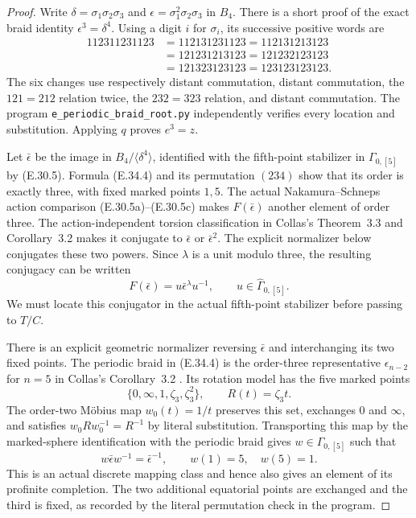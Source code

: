 \begin{proof}
Write
$\delta=\sigma_1\sigma_2\sigma_3$ and
$\epsilon=\sigma_1^2\sigma_2\sigma_3$ in $B_4$.
There is a short proof of the exact braid identity
$\epsilon^3=\delta^4$.  Using a digit $i$ for
$\sigma_i$, its successive positive words are
\[
\begin{aligned}
 112311231123&=112131231123=112131213123\\
             &=121231213123=121232123123\\
             &=121323123123=123123123123.
\end{aligned}
 \tag{E.34.4}
\]
The six changes use respectively distant commutation,
distant commutation, the $121=212$ relation twice,
the $232=323$ relation, and distant commutation.
The program \texttt{e\_periodic\_braid\_root.py}
independently verifies every location and substitution.
Applying $q$ proves $e^3=z$.

Let $\bar\epsilon$ be the image in
$B_4/\langle\delta^4\rangle$, identified with the
fifth-point stabilizer in $\Gamma_{0,[5]}$ by
\textup{(E.30.5)}.  Formula \textup{(E.34.4)} and
its permutation $(234)$ show that its order is
exactly three, with fixed marked points $1,5$.
The actual Nakamura--Schneps action comparison
\textup{(E.30.5a)--(E.30.5c)} makes
$F(\bar\epsilon)$ another element of order three.
The action-independent torsion classification in
Collas's Theorem~3.3 and Corollary~3.2 makes it
conjugate to $\bar\epsilon$ or $\bar\epsilon^2$.
The explicit normalizer below conjugates these
two powers.  Since $\lambda$ is a unit modulo
three, the resulting conjugacy can be written
\[
 F(\bar\epsilon)=u\bar\epsilon^\lambda u^{-1},
                   \qquad u\in\widehat\Gamma_{0,[5]}.
 \tag{E.34.5}
\]
We must locate this conjugator in the actual
fifth-point stabilizer before passing to $T/C$.

There is an explicit geometric normalizer reversing
$\bar\epsilon$ and interchanging its two fixed
points.  The periodic braid in
\textup{(E.34.4)} is the order-three representative
$\epsilon_{n-2}$ for $n=5$ in Collas's
Corollary~3.2 \cite{ERootCollas2012}.
Its rotation model has the five marked points
\[
                    \{0,\infty,1,\zeta_3,\zeta_3^2\},
 \qquad R(t)=\zeta_3t.
 \tag{E.34.6}
\]
The order-two Möbius map $w_0(t)=1/t$ preserves
this set, exchanges $0$ and $\infty$, and satisfies
$w_0Rw_0^{-1}=R^{-1}$ by literal substitution.
Transporting this map by the marked-sphere
identification with the periodic braid gives
$w\in\Gamma_{0,[5]}$ such that
\[
 w\bar\epsilon w^{-1}=\bar\epsilon^{-1},
                 \qquad w(1)=5,\quad w(5)=1.
 \tag{E.34.7}
\]
This is an actual discrete mapping class and hence
also gives an element of its profinite completion.
The two additional equatorial points are exchanged
and the third is fixed, as recorded by the literal
permutation check in the program.


\end{proof}
